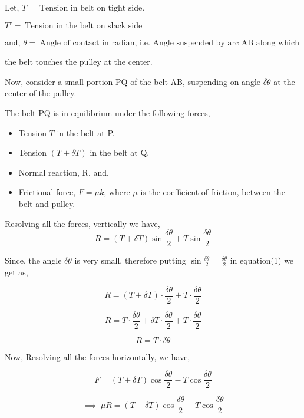 \documentclass[12pt,a4paper]{article}
\begin{document}
    Let, $T =\  \mbox{Tension in belt on tight side.}$

    $T' =\ \mbox{Tension in the belt on slack side}$

    and, $\theta =\ \mbox{Angle of contact in radian, i.e. Angle suspended by arc AB along which}$ 
    
    the belt touches the pulley at the center.

    Now, consider a small portion PQ of the belt AB, suspending on angle $\delta \theta$ at the center of the pulley.

    The belt PQ is in equilibrium under the following forces,
    \begin{itemize}
        \item Tension $T$ in the belt at P.
        \item Tension $(T + \delta T)$ in the belt at Q.
        \item Normal reaction, R. and,
        \item Frictional force, $F = \mu k$,
        where $\mu$ is the coefficient of friction, between the belt and pulley.
    \end{itemize}

    Resolving all the forces, vertically we have,
    \begin{equation*}
        R = \left(T + \delta T\right)\sin\frac{\delta \theta}{2} + T\sin\frac{\delta \theta}{2} \tag*{(1)}
    \end{equation*}

    Since, the angle $\delta \theta$ is very small, therefore putting $\sin\frac{\delta \theta}{2} = \frac{\delta \theta}{2}$ in equation(1) we get as,
    
    \[R = \left(T + \delta T\right)\cdot \frac{\delta \theta}{2} + T\cdot \frac{\delta \theta}{2}\]

    \[R = T\cdot \frac{\delta \theta}{2} + \delta T \cdot \frac{\delta \theta}{2} + T\cdot \frac{\delta \theta}{2}\]

    \begin{equation*}
        R = T\cdot \delta \theta \tag*{(2)}
    \end{equation*}

    Now, Resolving all the forces horizontally, we have,
    
    \[F = \left(T + \delta T\right)\cos\frac{\delta \theta}{2} - T\cos\frac{\delta \theta}{2}\]

    \begin{equation*}
        \implies\ \mu R = \left(T + \delta T\right)\cos\frac{\delta \theta}{2} - T\cos\frac{\delta \theta}{2} \tag*{(3)}
    \end{equation*}
\end{document}
